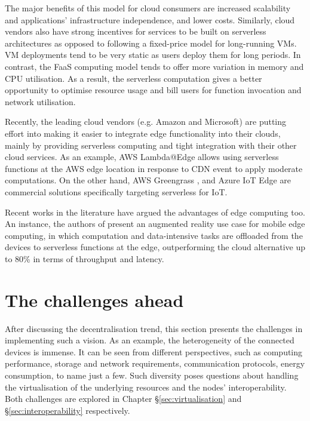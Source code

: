 The major benefits of this model for cloud consumers are increased scalability and applications' infrastructure independence, and lower costs. Similarly, cloud vendors also have strong incentives for services to be built on serverless architectures as opposed to following a fixed-price model for long-running VMs. VM deployments tend to be very static as users deploy them for long periods. In contrast, the FaaS computing model tends to offer more variation in memory and CPU utilisation. As a result, the serverless computation gives a better opportunity to optimise resource usage and bill users for function invocation and network utilisation.

Recently, the leading cloud vendors (e.g. Amazon and Microsoft) are putting effort into making it easier to integrate edge functionality into their clouds, mainly by providing serverless computing and tight integration with their other cloud services. As an example, AWS Lambda@Edge \cite{aws-lambda-edge} allows using serverless functions at the AWS edge location in response to CDN event to apply moderate computations. On the other hand, AWS Greengrass \cite{aws-greengrass}, and Azure IoT Edge \cite{azure-iot-edge} are commercial solutions specifically targeting serverless for IoT.

Recent works in the literature have argued the advantages of edge computing too. An instance, the authors of \cite{serverless-mec} present an augmented reality use case for mobile edge computing, in which computation and data-intensive tasks are offloaded from the devices to serverless functions at the edge, outperforming the cloud alternative up to 80\% in terms of throughput and latency.

\section{The challenges ahead}
\label{challenges}

After discussing the decentralisation trend, this section presents the challenges in implementing such a vision. As an example, the heterogeneity of the connected devices is immense. It can be seen from different perspectives, such as computing performance, storage and network requirements, communication protocols, energy consumption, to name just a few. Such diversity poses questions about handling the virtualisation of the underlying resources and the nodes' interoperability. Both challenges are explored in Chapter §\ref{sec:virtualisation} and §\ref{sec:interoperability} respectively.

